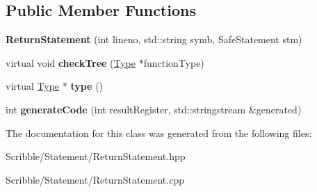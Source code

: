 \subsection*{Public Member Functions}
\begin{DoxyCompactItemize}
\item 
\hypertarget{class_return_statement_aff92621b04d86cf554e216948e6d7315}{{\bfseries Return\-Statement} (int lineno, std\-::string symb, Safe\-Statement stm)}\label{class_return_statement_aff92621b04d86cf554e216948e6d7315}

\item 
\hypertarget{class_return_statement_aecc85b0e46de25e48aaa846080bd8f3e}{virtual void {\bfseries check\-Tree} (\hyperlink{class_type}{Type} $\ast$function\-Type)}\label{class_return_statement_aecc85b0e46de25e48aaa846080bd8f3e}

\item 
\hypertarget{class_return_statement_a29537a76d5af4db7062a3b93516eab0a}{virtual \hyperlink{class_type}{Type} $\ast$ {\bfseries type} ()}\label{class_return_statement_a29537a76d5af4db7062a3b93516eab0a}

\item 
\hypertarget{class_return_statement_a3ae0f6ae6c494fb85b603a54564f4c90}{int {\bfseries generate\-Code} (int result\-Register, std\-::stringstream \&generated)}\label{class_return_statement_a3ae0f6ae6c494fb85b603a54564f4c90}

\end{DoxyCompactItemize}


The documentation for this class was generated from the following files\-:\begin{DoxyCompactItemize}
\item 
Scribble/\-Statement/Return\-Statement.\-hpp\item 
Scribble/\-Statement/Return\-Statement.\-cpp\end{DoxyCompactItemize}
